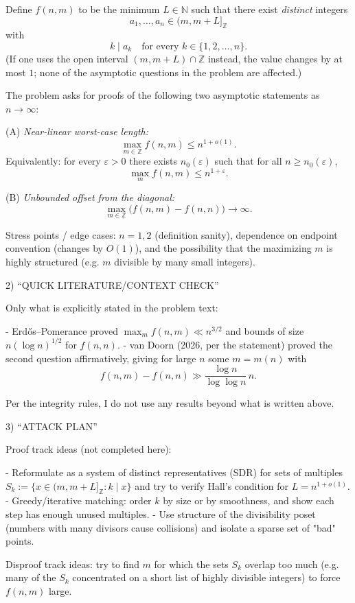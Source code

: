 Define $f(n,m)$ to be the minimum $L\in\mathbb N$ such that there exist \emph{distinct} integers
\[
 a_1,\dots,a_n\in (m,m+L]_{\mathbb Z}
\]
with
\[
 k\mid a_k\quad\text{for every }k\in\{1,2,\dots,n\}.
\]
(If one uses the open interval $(m,m+L)\cap\mathbb Z$ instead, the value changes by at most $1$; none of the asymptotic questions in the problem are affected.)

The problem asks for proofs of the following two asymptotic statements as $n\to\infty$:

(A) \emph{Near-linear worst-case length:}
\[
\max_{m\in\mathbb Z} f(n,m) \le n^{1+o(1)}.
\]
Equivalently: for every $\varepsilon>0$ there exists $n_0(\varepsilon)$ such that for all $n\ge n_0(\varepsilon)$,
\[
\max_m f(n,m) \le n^{1+\varepsilon}.
\]

(B) \emph{Unbounded offset from the diagonal:}
\[
\max_{m\in\mathbb Z}\bigl(f(n,m)-f(n,n)\bigr)\to\infty.
\]

Stress points / edge cases: $n=1,2$ (definition sanity), dependence on endpoint convention (changes by $O(1)$), and the possibility that the maximizing $m$ is highly structured (e.g. $m$ divisible by many small integers).

2) “QUICK LITERATURE/CONTEXT CHECK”

Only what is explicitly stated in the problem text:

- Erd\H{o}s--Pomerance proved $\max_m f(n,m)\ll n^{3/2}$ and bounds of size $n(\log n)^{1/2}$ for $f(n,n)$.
- van Doorn (2026, per the statement) proved the second question affirmatively, giving for large $n$ some $m=m(n)$ with
\[
 f(n,m)-f(n,n) \gg \frac{\log n}{\log\log n}\,n.
\]

Per the integrity rules, I do not use any results beyond what is written above.

3) “ATTACK PLAN”

Proof track ideas (not completed here):

- Reformulate as a system of distinct representatives (SDR) for sets of multiples $S_k := \{x\in(m,m+L]_{\mathbb Z}: k\mid x\}$ and try to verify Hall's condition for $L=n^{1+o(1)}$.
- Greedy/iterative matching: order $k$ by size or by smoothness, and show each step has enough unused multiples.
- Use structure of the divisibility poset (numbers with many divisors cause collisions) and isolate a sparse set of "bad" points.

Disproof track ideas: try to find $m$ for which the sets $S_k$ overlap too much (e.g. many of the $S_k$ concentrated on a short list of highly divisible integers) to force $f(n,m)$ large.

